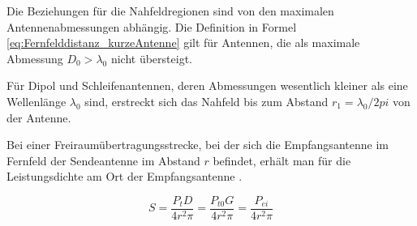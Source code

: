 Die Beziehungen für die Nahfeldregionen sind von den maximalen Antennenabmessungen abhängig.  Die Definition in Formel \ref{eq:Fernfelddistanz_kurzeAntenne} gilt für Antennen, die als maximale Abmessung $D_{0}>\lambda_{0}$ nicht übersteigt.

Für Dipol und Schleifenantennen, deren Abmessungen wesentlich kleiner als eine Wellenlänge $\lambda_{0}$ sind, erstreckt sich das Nahfeld bis zum  Abstand   $r_{1}=\lambda_{0}/2pi$ von der Antenne.

Bei einer Freiraumübertragungsstrecke, bei der sich die Empfangsantenne im Fernfeld der Sendeantenne im Abstand $r$ befindet, erhält man für die Leistungsdichte am Ort der Empfangsantenne \cite{meinke1992taschenbuch}.

\begin{equation}
S=\dfrac{P_{t}D}{4r^{2}\pi} = \dfrac{P_{t0}G}{4r^{2}\pi}=\dfrac{P_{ei}}{4r^{2}\pi}\label{eq:LeistungsdichteS}
\end{equation}


%
%	
%	
%	
%	
%
%	
%
%
